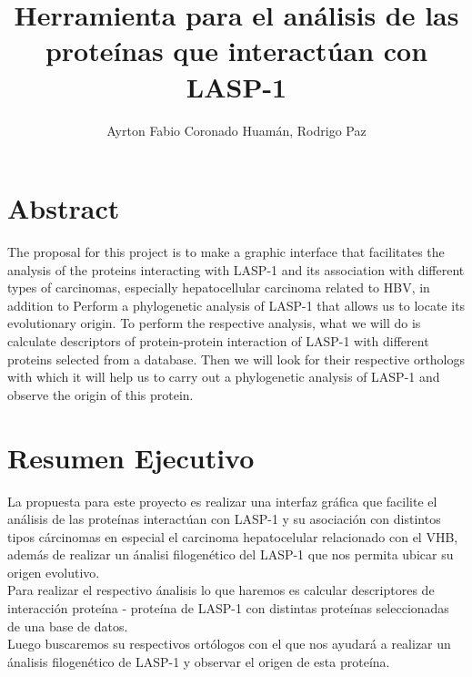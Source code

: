 \documentclass[twocolumn,twoside,11pt]{article}
\begin{document}
\title{Herramienta para el an\'alisis de las prote\'inas que interact\'uan con LASP-1}

\author{Ayrton Fabio Coronado Huam\'an,  Rodrigo Paz
}





\maketitle
\markboth{}{}
\pagestyle{empty} 
\thispagestyle{empty} %
\section{Abstract}

The proposal for this project is to make a graphic interface that facilitates the analysis of the proteins interacting with LASP-1 and its association with different types of carcinomas, especially hepatocellular carcinoma related to HBV, in addition to
Perform a phylogenetic analysis of LASP-1 that allows us to locate its evolutionary origin.
To perform the respective analysis, what we will do is calculate descriptors of protein-protein interaction of LASP-1 with different proteins selected from a database.
Then we will look for their respective orthologs with which it will help us to carry out a phylogenetic analysis of LASP-1 and observe the origin of this protein.

\section{Resumen Ejecutivo}

La propuesta para este proyecto es realizar una interfaz gr\'afica que facilite el an\'alisis de las prote\'inas interact\'uan con LASP-1 y su asociaci\'on con distintos tipos c\'arcinomas en especial el carcinoma hepatocelular relacionado con el VHB, adem\'as de
realizar un \'analisi filogen\'etico del LASP-1 que nos permita ubicar su origen evolutivo.\\


Para realizar el respectivo \'analisis lo que haremos es calcular descriptores de interacci\'on prote\'ina - prote\'ina de LASP-1 con distintas prote\'inas seleccionadas de una base de datos.\\

Luego buscaremos su respectivos ort\'ologos con el que nos ayudar\'a a realizar un \'analisis filogen\'etico de LASP-1 y observar el origen de esta prote\'ina.\\
\end{document}
